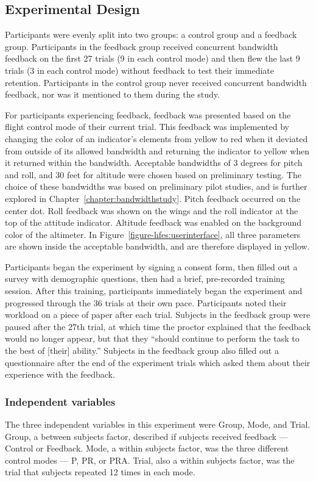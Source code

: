 \subsection{Experimental Design}
Participants were evenly split into two groups: a control group and a feedback group.
Participants in the feedback group received concurrent bandwidth feedback on the first 27 trials (9 in each control mode) and then flew the last 9 trials (3 in each control mode) without feedback to test their immediate retention.
Participants in the control group never received concurrent bandwidth feedback, nor was it mentioned to them during the study.

For participants experiencing feedback, feedback was presented based on the flight control mode of their current trial.
This feedback was implemented by changing the color of an indicator's elements from yellow to red when it deviated from outside of its allowed bandwidth and returning the indicator to yellow when it returned within the bandwidth.
Acceptable bandwidths of 3 degrees for pitch and roll, and 30 feet for altitude were chosen based on preliminary testing.
The choice of these bandwidths was based on preliminary pilot studies, and is further explored in Chapter~\ref{chapter:bandwidthstudy}.
Pitch feedback occurred on the center dot.
Roll feedback was shown on the wings and the roll indicator at the top of the attitude indicator.
Altitude feedback was enabled on the background color of the altimeter.
In Figure~\ref{figure-hfes:userinterface}, all three parameters are shown inside the acceptable bandwidth, and are therefore displayed in yellow.

Participants began the experiment by signing a consent form, then filled out a survey with demographic questions, then had a brief, pre-recorded training session.
After this training, participants immediately began the experiment and progressed through the 36 trials at their own pace.
Participants noted their workload on a piece of paper after each trial.
Subjects in the feedback group were paused after the 27th trial, at which time the proctor explained that the feedback would no longer appear, but that they ``should continue to perform the task to the best of [their] ability.'' Subjects in the feedback group also filled out a questionnaire after the end of the experiment trials which asked them about their experience with the feedback.

\subsubsection{Independent variables}
The three independent variables in this experiment were Group, Mode, and Trial.
Group, a between subjects factor, described if subjects received feedback --- Control or Feedback.
Mode, a within subjects factor, was the three different control modes --- P, PR, or PRA.
Trial, also a within subjects factor, was the trial that subjects repeated 12 times in each mode.

